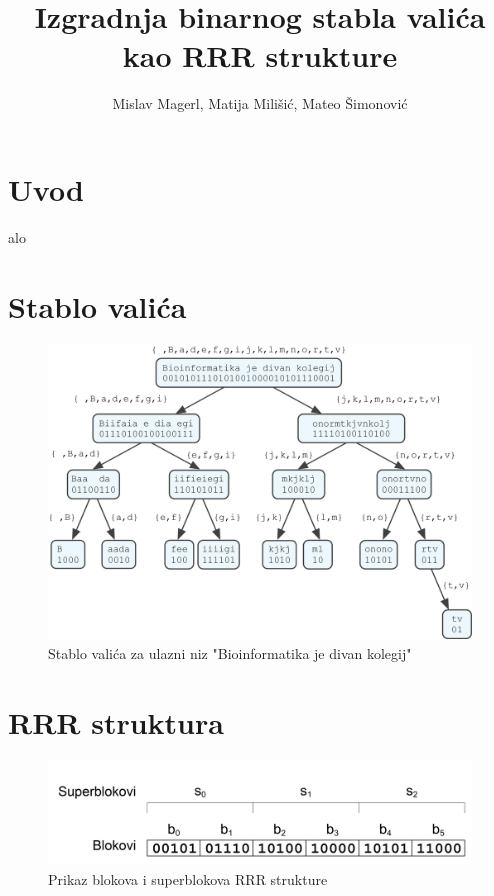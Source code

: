 \documentclass[times, utf8, seminar, numeric]{fer}
\begin{document}
\title{Izgradnja binarnog stabla valića kao RRR strukture}
\author{Mislav Magerl, Matija Milišić, Mateo Šimonović}

\maketitle

\tableofcontents

\chapter{Uvod}
alo

\chapter{Stablo valića}
\begin{figure}[ht]
	\centering
	\includegraphics[width=\textwidth]{img/wavelet_tree_example.png}
	\caption{Stablo valića za ulazni niz "Bioinformatika je divan kolegij"}
	\label{fig:wavelet-tree-example}
\end{figure}

\chapter{RRR struktura}
\begin{figure}[ht]
	\centering
	\includegraphics[width=\textwidth]{img/rrr_blocks.png}
	\caption{Prikaz blokova i superblokova RRR strukture}
	\label{fig:rrr-blocks}
\end{figure}
\end{document}
